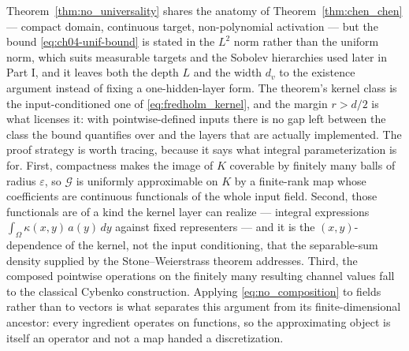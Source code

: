 Theorem~\ref{thm:no_universality} shares the anatomy of Theorem~\ref{thm:chen_chen} --- compact domain, continuous target, non-polynomial activation --- but the bound \eqref{eq:ch04-unif-bound} is stated in the $L^{2}$ norm rather than the uniform norm, which suits measurable targets and the Sobolev hierarchies used later in Part I, and it leaves both the depth $L$ and the width $d_{v}$ to the existence argument instead of fixing a one-hidden-layer form. The theorem's kernel class is the input-conditioned one of \eqref{eq:fredholm_kernel}, and the margin $r > d/2$ is what licenses it: with pointwise-defined inputs there is no gap left between the class the bound quantifies over and the layers that are actually implemented. The proof strategy is worth tracing, because it says what integral parameterization is for. First, compactness makes the image of $K$ coverable by finitely many balls of radius $\varepsilon$, so $\mathcal{G}$ is uniformly approximable on $K$ by a finite-rank map whose coefficients are continuous functionals of the whole input field. Second, those functionals are of a kind the kernel layer can realize --- integral expressions $\int_\Omega \kappa(x, y)\, a(y) \, dy$ against fixed representers --- and it is the $(x,y)$-dependence of the kernel, not the input conditioning, that the separable-sum density supplied by the Stone--Weierstrass theorem addresses. Third, the composed pointwise operations on the finitely many resulting channel values fall to the classical Cybenko construction. Applying \eqref{eq:no_composition} to fields rather than to vectors is what separates this argument from its finite-dimensional ancestor: every ingredient operates on functions, so the approximating object is itself an operator and not a map handed a discretization.

